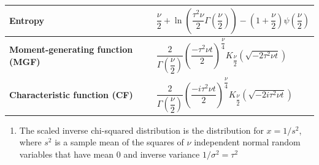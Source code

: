 \begin{customTableWrapper}{2}
\begin{longtable}{|m{6cm}|p{9cm}|}
    \textbf{Entropy} &
    ${ {\dfrac {\nu }{2}}\!+\!\ln \left({\dfrac {\tau ^{2}\nu }{2}}\Gamma \left({\dfrac {\nu }{2}}\right)\right)}{ \!-\!\left(1\!+\!{\dfrac {\nu }{2}}\right)\psi \left({\dfrac {\nu }{2}}\right)}$
    \\[1ex] \hline

    \textbf{Moment-generating function (MGF)} &
    ${ {\dfrac {2}{\Gamma ({\dfrac {\nu }{2}})}}\left({\dfrac {-\tau ^{2}\nu t}{2}}\right)^{\!\!{\dfrac {\nu }{4}}}\!\!K_{\dfrac {\nu }{2}}\left({\sqrt {-2\tau ^{2}\nu t}}\right)}$
    \\[1ex] \hline

    \textbf{Characteristic function (CF)} &
    ${ {\dfrac {2}{\Gamma ({\dfrac {\nu }{2}})}}\left({\dfrac {-i\tau ^{2}\nu t}{2}}\right)^{\!\!{\dfrac {\nu }{4}}}\!\!K_{\dfrac {\nu }{2}}\left({\sqrt {-2i\tau ^{2}\nu t}}\right)}$
    \\[1ex] \hline

\end{longtable}
\end{customTableWrapper}

\begin{enumerate}
    \item The scaled inverse chi-squared distribution is the distribution for $x = 1/s^2$, where $s^2$ is a sample mean of the squares of $\nu$ independent normal random variables that have mean $0$ and inverse variance $1/\sigma^2 = \tau^2$

\end{enumerate}























































